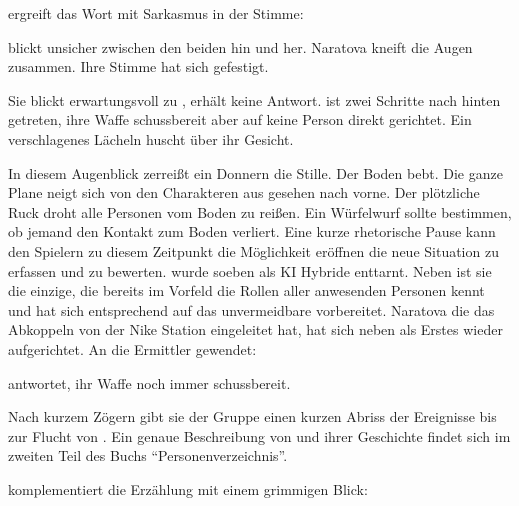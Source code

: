 \xl{} ergreift das Wort mit Sarkasmus in der Stimme:


\ml{} blickt unsicher zwischen den beiden hin und her. Naratova kneift die Augen zusammen. Ihre Stimme hat sich gefestigt.


Sie blickt erwartungsvoll zu \xl{}, erhält keine Antwort. \xl{} ist zwei Schritte nach hinten getreten, ihre Waffe schussbereit aber auf keine Person direkt gerichtet. Ein verschlagenes Lächeln huscht über ihr Gesicht.

In diesem Augenblick zerreißt ein Donnern die Stille. Der Boden bebt. Die ganze Plane neigt sich von den Charakteren aus gesehen nach vorne. Der plötzliche Ruck droht alle Personen vom Boden zu reißen. Ein Würfelwurf sollte bestimmen, ob jemand den Kontakt zum Boden verliert. Eine kurze rhetorische Pause kann den Spielern zu diesem Zeitpunkt die Möglichkeit eröffnen die neue Situation zu erfassen und zu bewerten. \xl{} wurde soeben als KI Hybride enttarnt. Neben \ml{} ist sie die einzige, die bereits im Vorfeld die Rollen aller anwesenden Personen kennt und hat sich entsprechend auf das unvermeidbare vorbereitet. Naratova die das Abkoppeln von der Nike Station eingeleitet hat, hat sich neben \xl{} als Erstes wieder aufgerichtet. An die Ermittler gewendet:


\xl{} antwortet, ihr Waffe noch immer schussbereit.


Nach kurzem Zögern gibt sie der Gruppe einen kurzen Abriss der Ereignisse bis zur Flucht von \xl{}. Ein genaue Beschreibung von \xl{} und ihrer Geschichte findet sich im zweiten Teil des Buchs "`Personenverzeichnis"'.

\xl{} komplementiert die Erzählung mit einem grimmigen Blick:



